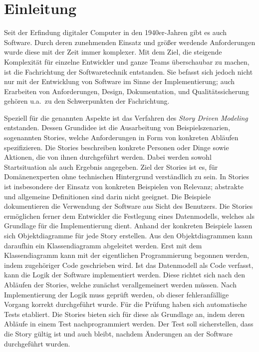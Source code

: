 \chapter{Einleitung}\label{ch:introduction}

Seit der Erfindung digitaler Computer in den 1940er-Jahren gibt es auch Software.
Durch deren zunehmenden Einsatz und größer werdende Anforderungen wurde diese mit der Zeit immer komplexer.
Mit dem Ziel, die steigende Komplexität für einzelne Entwickler und ganze Teams überschaubar zu machen, ist die Fachrichtung der Softwaretechnik entstanden.
Sie befasst sich jedoch nicht nur mit der Entwicklung von Software im Sinne der Implementierung;
auch Erarbeiten von Anforderungen, Design, Dokumentation, und Qualitätssicherung gehören u.a.\ zu den Schwerpunkten der Fachrichtung.

Speziell für die genannten Aspekte ist das Verfahren des \emph{Story Driven Modeling}~\cite{sdm} entstanden.
Dessen Grundidee ist die Ausarbeitung von Beispielszenarien, sogenannten Stories, welche Anforderungen in Form von konkreten Abläufen spezifizieren.
Die Stories beschreiben konkrete Personen oder Dinge sowie Aktionen, die von ihnen durchgeführt werden.
Dabei werden sowohl Startsituation als auch Ergebnis angegeben.
Ziel der Stories ist es, für Domänenexperten ohne technischen Hintergrund verständlich zu sein.
In Stories ist insbesondere der Einsatz von konkreten Beispielen von Relevanz;
abstrakte und allgemeine Definitionen sind darin nicht geeignet.
Die Beispiele dokumentieren die Verwendung der Software aus Sicht des Benutzers.
Die Stories ermöglichen ferner dem Entwickler die Festlegung eines Datenmodells, welches als Grundlage für die Implementierung dient.
Anhand der konkreten Beispiele lassen sich Objektdiagramme für jede Story erstellen.
Aus den Objektdiagrammen kann daraufhin ein Klassendiagramm abgeleitet werden.
Erst mit dem Klassendiagramm kann mit der eigentlichen Programmierung begonnen werden, indem zugehöriger Code geschrieben wird.
Ist das Datenmodell als Code verfasst, kann die Logik der Software implementiert werden.
Diese richtet sich nach den Abläufen der Stories, welche zunächst verallgemeinert werden müssen.
Nach Implementierung der Logik muss geprüft werden, ob dieser fehleranfällige Vorgang korrekt durchgeführt wurde.
Für die Prüfung haben sich automatische Tests etabliert.
Die Stories bieten sich für diese als Grundlage an, indem deren Abläufe in einem Test nachprogrammiert werden.
Der Test soll sicherstellen, dass die Story gültig ist und auch bleibt, nachdem Änderungen an der Software durchgeführt wurden.

